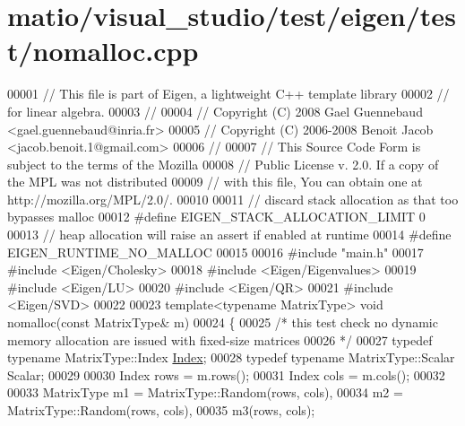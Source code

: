 \hypertarget{matio_2visual__studio_2test_2eigen_2test_2nomalloc_8cpp_source}{}\section{matio/visual\+\_\+studio/test/eigen/test/nomalloc.cpp}
\label{matio_2visual__studio_2test_2eigen_2test_2nomalloc_8cpp_source}

\begin{DoxyCode}
00001 \textcolor{comment}{// This file is part of Eigen, a lightweight C++ template library}
00002 \textcolor{comment}{// for linear algebra.}
00003 \textcolor{comment}{//}
00004 \textcolor{comment}{// Copyright (C) 2008 Gael Guennebaud <gael.guennebaud@inria.fr>}
00005 \textcolor{comment}{// Copyright (C) 2006-2008 Benoit Jacob <jacob.benoit.1@gmail.com>}
00006 \textcolor{comment}{//}
00007 \textcolor{comment}{// This Source Code Form is subject to the terms of the Mozilla}
00008 \textcolor{comment}{// Public License v. 2.0. If a copy of the MPL was not distributed}
00009 \textcolor{comment}{// with this file, You can obtain one at http://mozilla.org/MPL/2.0/.}
00010 
00011 \textcolor{comment}{// discard stack allocation as that too bypasses malloc}
00012 \textcolor{preprocessor}{#define EIGEN\_STACK\_ALLOCATION\_LIMIT 0}
00013 \textcolor{comment}{// heap allocation will raise an assert if enabled at runtime}
00014 \textcolor{preprocessor}{#define EIGEN\_RUNTIME\_NO\_MALLOC}
00015 
00016 \textcolor{preprocessor}{#include "main.h"}
00017 \textcolor{preprocessor}{#include <Eigen/Cholesky>}
00018 \textcolor{preprocessor}{#include <Eigen/Eigenvalues>}
00019 \textcolor{preprocessor}{#include <Eigen/LU>}
00020 \textcolor{preprocessor}{#include <Eigen/QR>}
00021 \textcolor{preprocessor}{#include <Eigen/SVD>}
00022 
00023 \textcolor{keyword}{template}<\textcolor{keyword}{typename} MatrixType> \textcolor{keywordtype}{void} nomalloc(\textcolor{keyword}{const} MatrixType& m)
00024 \{
00025   \textcolor{comment}{/* this test check no dynamic memory allocation are issued with fixed-size matrices}
00026 \textcolor{comment}{  */}
00027   \textcolor{keyword}{typedef} \textcolor{keyword}{typename} MatrixType::Index \hyperlink{namespace_eigen_a62e77e0933482dafde8fe197d9a2cfde}{Index};
00028   \textcolor{keyword}{typedef} \textcolor{keyword}{typename} MatrixType::Scalar Scalar;
00029 
00030   Index rows = m.rows();
00031   Index cols = m.cols();
00032 
00033   MatrixType m1 = MatrixType::Random(rows, cols),
00034              m2 = MatrixType::Random(rows, cols),
00035              m3(rows, cols);

\end{DoxyCode}
